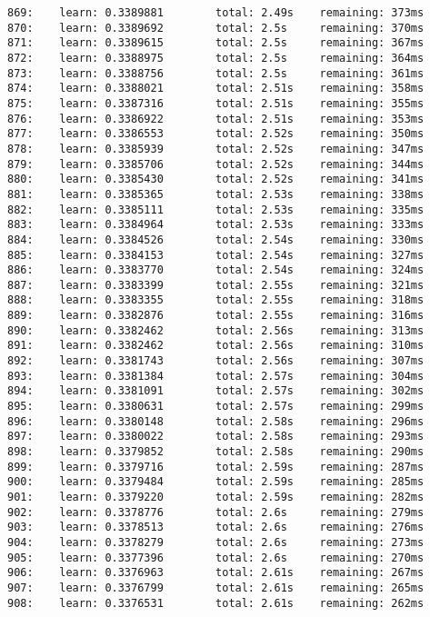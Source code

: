 \documentclass[11pt]{article}
\begin{document}
\begin{Verbatim}[commandchars=\\\{\}]
869:    learn: 0.3389881        total: 2.49s    remaining: 373ms
870:    learn: 0.3389692        total: 2.5s     remaining: 370ms
871:    learn: 0.3389615        total: 2.5s     remaining: 367ms
872:    learn: 0.3388975        total: 2.5s     remaining: 364ms
873:    learn: 0.3388756        total: 2.5s     remaining: 361ms
874:    learn: 0.3388021        total: 2.51s    remaining: 358ms
875:    learn: 0.3387316        total: 2.51s    remaining: 355ms
876:    learn: 0.3386922        total: 2.51s    remaining: 353ms
877:    learn: 0.3386553        total: 2.52s    remaining: 350ms
878:    learn: 0.3385939        total: 2.52s    remaining: 347ms
879:    learn: 0.3385706        total: 2.52s    remaining: 344ms
880:    learn: 0.3385430        total: 2.52s    remaining: 341ms
881:    learn: 0.3385365        total: 2.53s    remaining: 338ms
882:    learn: 0.3385111        total: 2.53s    remaining: 335ms
883:    learn: 0.3384964        total: 2.53s    remaining: 333ms
884:    learn: 0.3384526        total: 2.54s    remaining: 330ms
885:    learn: 0.3384153        total: 2.54s    remaining: 327ms
886:    learn: 0.3383770        total: 2.54s    remaining: 324ms
887:    learn: 0.3383399        total: 2.55s    remaining: 321ms
888:    learn: 0.3383355        total: 2.55s    remaining: 318ms
889:    learn: 0.3382876        total: 2.55s    remaining: 316ms
890:    learn: 0.3382462        total: 2.56s    remaining: 313ms
891:    learn: 0.3382462        total: 2.56s    remaining: 310ms
892:    learn: 0.3381743        total: 2.56s    remaining: 307ms
893:    learn: 0.3381384        total: 2.57s    remaining: 304ms
894:    learn: 0.3381091        total: 2.57s    remaining: 302ms
895:    learn: 0.3380631        total: 2.57s    remaining: 299ms
896:    learn: 0.3380148        total: 2.58s    remaining: 296ms
897:    learn: 0.3380022        total: 2.58s    remaining: 293ms
898:    learn: 0.3379852        total: 2.58s    remaining: 290ms
899:    learn: 0.3379716        total: 2.59s    remaining: 287ms
900:    learn: 0.3379484        total: 2.59s    remaining: 285ms
901:    learn: 0.3379220        total: 2.59s    remaining: 282ms
902:    learn: 0.3378776        total: 2.6s     remaining: 279ms
903:    learn: 0.3378513        total: 2.6s     remaining: 276ms
904:    learn: 0.3378279        total: 2.6s     remaining: 273ms
905:    learn: 0.3377396        total: 2.6s     remaining: 270ms
906:    learn: 0.3376963        total: 2.61s    remaining: 267ms
907:    learn: 0.3376799        total: 2.61s    remaining: 265ms
908:    learn: 0.3376531        total: 2.61s    remaining: 262ms

\end{Verbatim}
\end{document}
